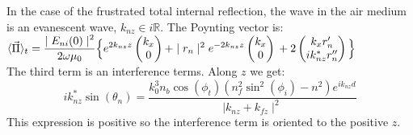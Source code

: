 In the case of the frustrated total internal reflection, the wave in the air medium is an evanescent wave, $k_{nz} \in i\mathbb{R}$. The Poynting vector is:\\
$
\langle \vec{\Pi} \rangle _t =\displaystyle\frac{\displaystyle\mid E_{ni}(0)\mid ^2}{\displaystyle2\omega \mu_0}\Big\{
e^{2k_{nz}z}
\begin{pmatrix}
k_x\\
0
\end{pmatrix}
+\mid r_n\mid ^2e^{-2k_{nz}z}
\begin{pmatrix}
k_x\\
0
\end{pmatrix}\\
+2
\begin{pmatrix}
k_xr_n'\\
ik_{nz}^*r_n''
\end{pmatrix}
\Big\}
$\\
The third term is an interference terms. Along $z$ we get:\\
$$
ik_{nz}^*\sin(\theta _n) =\frac{ k_0^3n_b\cos(\phi _t)(n_f^2\sin ^2(\phi _i)-n^2)e^{ik_{nz}d}}{\mid k_{nz}+k_{fz}\mid ^2}
$$
This expression is positive so the interference term is oriented to the positive $z$.
